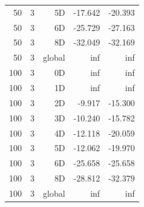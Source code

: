 \begin{longtable}{rrrrr}
50 & 3 & 5D & -17.642 & -20.393 \\
50 & 3 & 6D & -25.729 & -27.163 \\
50 & 3 & 8D & -32.049 & -32.169 \\
50 & 3 & global & inf & inf \\
100 & 3 & 0D & inf & inf \\
100 & 3 & 1D & inf & inf \\
100 & 3 & 2D & -9.917 & -15.300 \\
100 & 3 & 3D & -10.240 & -15.782 \\
100 & 3 & 4D & -12.118 & -20.059 \\
100 & 3 & 5D & -12.062 & -19.970 \\
100 & 3 & 6D & -25.658 & -25.658 \\
100 & 3 & 8D & -28.812 & -32.379 \\
100 & 3 & global & inf & inf \\
\end{longtable}
